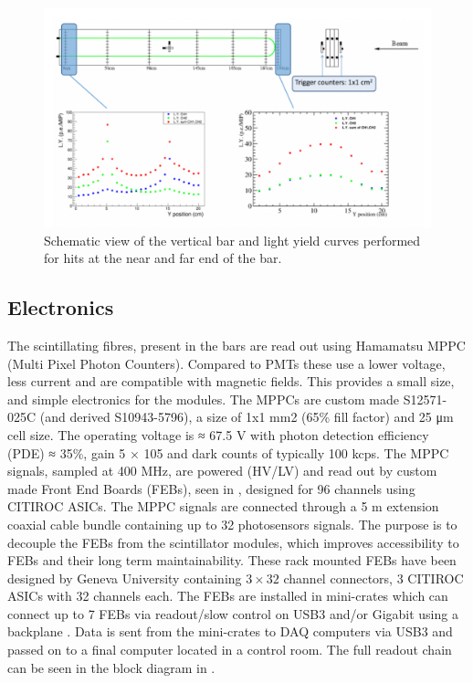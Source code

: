 \begin{figure}[h!]
\centering
\includegraphics[width=\textwidth]{figures/vertical.png}
\caption{Schematic view of the vertical bar and light yield curves performed for hits at the near and far end of the bar.}
\label{fig:vertical}
\end{figure}


\subsection{Electronics}
The scintillating fibres, present in the bars are read out using Hamamatsu MPPC (Multi Pixel Photon Counters). Compared to PMTs these use a lower voltage, less current and are compatible with magnetic fields. This provides a small size, and simple electronics for the modules. The MPPCs are custom made S12571-025C (and derived S10943-5796), a size of 1x1 mm2 (65\% fill factor) and 25 μm cell size. The operating voltage is ≈ 67.5 V with photon detection efficiency (PDE) ≈ 35\%, gain 5 × 105 and dark counts of typically 100 kcps. The MPPC signals, sampled at 400 MHz, are powered (HV/LV) and read out by custom made Front End Boards (FEBs), seen in , designed for 96 channels using CITIROC ASICs. The MPPC signals are connected through a 5 m extension coaxial cable bundle containing up to 32 photosensors signals. The purpose is to decouple the FEBs from the scintillator modules, which improves accessibility to FEBs and their long term maintainability. These rack mounted FEBs have been designed by Geneva University containing $3 \times 32$ channel connectors, 3 CITIROC ASICs with 32 channels each. The FEBs are installed in mini-crates which can connect up to 7 FEBs via readout/slow control on USB3 and/or Gigabit using a backplane . 
Data is sent from the mini-crates to DAQ computers via USB3 and passed on to a final computer located in a control room. The full readout chain can be seen in the block diagram in .

